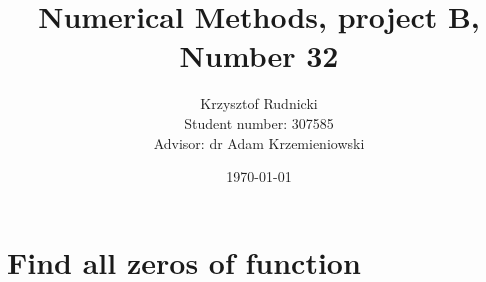 \documentclass[12pt]{report}
\title{Numerical Methods, project B, Number 32}
\author{Krzysztof Rudnicki\\ Student number: 307585 \\ Advisor: dr Adam Krzemieniowski}
\date{\today}
\begin{document}
\maketitle
\tableofcontents

\chapter{Find all zeros of function}

	
	
	
	
	
	
	
	
	
	
	
\end{document}
